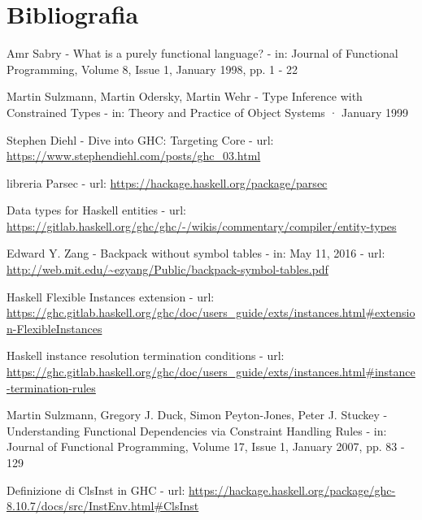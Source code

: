 \documentclass[10pt,a4paper]{article}
\begin{document}
\section*{Bibliografia}
\begin{enumerate}[label={[\arabic*]}]
    \item Amr Sabry - What is a purely functional language? - in: Journal of Functional Programming, Volume 8, Issue 1,
    January 1998, pp. 1 - 22
    \item Martin Sulzmann, Martin Odersky, Martin Wehr - Type Inference with Constrained Types - in: Theory and Practice
    of Object Systems · January 1999
    \item Stephen Diehl - Dive into GHC: Targeting Core - url: \url{https://www.stephendiehl.com/posts/ghc_03.html}
    \item libreria Parsec - url: \url{https://hackage.haskell.org/package/parsec}
    \item Data types for Haskell entities - url:
    \url{https://gitlab.haskell.org/ghc/ghc/-/wikis/commentary/compiler/entity-types}
    \item Edward Y. Zang - Backpack without symbol tables - in: May 11, 2016 - url:
    \url{http://web.mit.edu/~ezyang/Public/backpack-symbol-tables.pdf}
    \item Haskell Flexible Instances extension - url:
    \url{https://ghc.gitlab.haskell.org/ghc/doc/users_guide/exts/instances.html#extension-FlexibleInstances}
    \item Haskell instance resolution termination conditions - url:
    \url{https://ghc.gitlab.haskell.org/ghc/doc/users_guide/exts/instances.html#instance-termination-rules}
    \item Martin Sulzmann, Gregory J. Duck, Simon Peyton-Jones, Peter J. Stuckey - Understanding Functional Dependencies
    via Constraint Handling Rules - in: Journal of Functional Programming, Volume 17, Issue 1, January 2007, pp. 83 - 129
    \item Definizione di ClsInst in GHC - url: \url{https://hackage.haskell.org/package/ghc-8.10.7/docs/src/InstEnv.html#ClsInst}
\end{enumerate}
\end{document}
